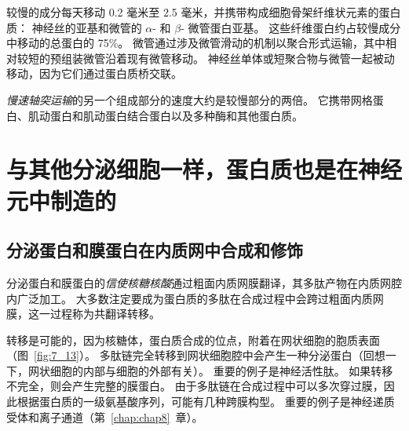 较慢的成分每天移动 0.2 毫米至 2.5 毫米，并携带构成细胞骨架纤维状元素的蛋白质：
神经丝的亚基和微管的 $\alpha$- 和 $\beta$- 微管蛋白亚基。
这些纤维蛋白约占较慢成分中移动的总蛋白的 75\%。 
微管通过涉及微管滑动的机制以聚合形式运输，其中相对较短的预组装微管沿着现有微管移动。
神经丝单体或短聚合物与微管一起被动移动，因为它们通过蛋白质桥交联。


\textit{慢速轴突运输}的另一个组成部分的速度大约是较慢部分的两倍。
它携带网格蛋白、肌动蛋白和肌动蛋白结合蛋白以及多种酶和其他蛋白质。



\section{与其他分泌细胞一样，蛋白质也是在神经元中制造的}

\subsection{分泌蛋白和膜蛋白在内质网中合成和修饰}

分泌蛋白和膜蛋白的\textit{信使核糖核酸}通过粗面内质网膜翻译，其多肽产物在内质网腔内广泛加工。
大多数注定要成为蛋白质的多肽在合成过程中会跨过粗面内质网膜，这一过程称为共翻译转移。


转移是可能的，因为核糖体，蛋白质合成的位点，附着在网状细胞的胞质表面（图~\ref{fig:7_13}）。 
多肽链完全转移到网状细胞腔中会产生一种分泌蛋白（回想一下，网状细胞的内部与细胞的外部有关）。
重要的例子是神经活性肽。
如果转移不完全，则会产生完整的膜蛋白。
由于多肽链在合成过程中可以多次穿过膜，因此根据蛋白质的一级氨基酸序列，可能有几种跨膜构型。
重要的例子是神经递质受体和离子通道（第~\ref{chap:chap8}~章）。


